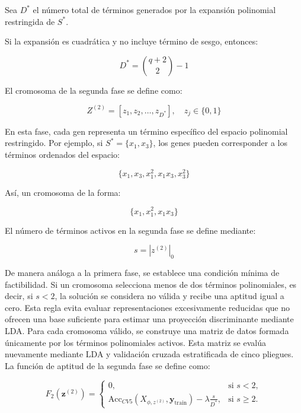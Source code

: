 Sea $D^*$ el número total de términos generados por la expansión polinomial restringida de $S^*$.

Si la expansión es cuadrática y no incluye término de sesgo, entonces:


\begin{equation}
	D^* = \binom{q+2}{2}-1
	\label{eq:EM7}
\end{equation}

El cromosoma de la segunda fase se define como:

\begin{equation}
	Z^{(2)} = [z_1,z_2,\dots,z_{D^*}],\quad z_j \in \{0,1\}
	\label{eq:EM8}
\end{equation}

En esta fase, cada gen representa un término específico del espacio polinomial restringido. Por ejemplo, si $S^*= \{x_1,x_3\}$, los genes pueden corresponder a los términos ordenados del espacio:

\begin{equation}
	\{x_1,x_3,x_1^2,x_1x_3,x_3^2\}
	\label{eq:EM9}
\end{equation}

Así, un cromosoma de la forma:

\begin{equation}
	\{x_1,x_1^2,x_1x_3\}
	\label{eq:EM10}
\end{equation}

El número de términos activos en la segunda fase se define mediante:

\begin{equation}
	s = |z^{(2)}|_0
	\label{eq:EM11}
\end{equation}

De manera análoga a la primera fase, se establece una condición mínima de factibilidad. Si un cromosoma selecciona menos de dos términos polinomiales, es decir, si $s<2$, la solución se considera no válida y recibe una aptitud igual a cero. Esta regla evita evaluar representaciones excesivamente reducidas que no ofrecen una base suficiente para estimar una proyección discriminante mediante LDA.
Para cada cromosoma válido, se construye una matriz de datos formada únicamente por los términos polinomiales activos. Esta matriz se evalúa nuevamente mediante LDA y validación cruzada estratificada de cinco pliegues. La función de aptitud de la segunda fase se define como:

\begin{equation}
	F_2(\mathbf{z}^{(2)}) = 
	\begin{cases} 
		0, & \text{si } s < 2, \\
		\text{Acc}_{CV5}(X_{\phi,z^{(2)}}, \mathbf{y}_{\text{train}}) - \lambda \frac{s}{D^*}, & \text{si } s \geq 2.
	\end{cases}
	\label{eq:EM12}
\end{equation}

